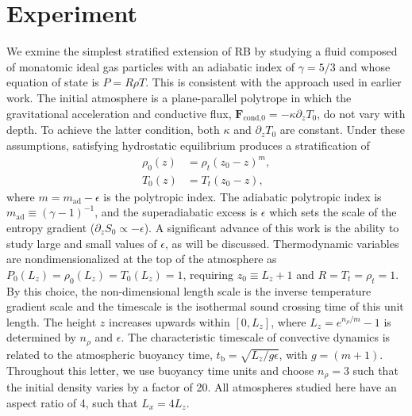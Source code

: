 \documentclass[aps, prl, twocolumn, nofootinbib, groupedaddress, amsfonts, amssymb, amsmath]{revtex4-1}
\begin{document}
\section{Experiment} 
\label{sec:experiment}
We exmine the simplest stratified extension of RB by studying a
fluid composed of monatomic ideal gas particles with an adiabatic 
index of $\gamma = 5/3$ and whose equation of state is $P = R\rho T$. 
This is consistent with the approach used in earlier work.
The initial atmosphere is a plane-parallel polytrope in which 
the gravitational acceleration and conductive flux, 
$\bm{F}_{\text{cond,0}} = -\kappa \partial_z T_0$, do not vary with depth. To
achieve the latter condition, both $\kappa$ and $\partial_z T_0$ are constant.
Under these assumptions, satisfying hydrostatic 
equilibrium produces a stratification of
\begin{equation}
\begin{split}
\rho_0(z) &= \rho_{t}(z_0 - z)^m, \\
T_0(z)    &= T_{t}(z_0 - z),
\label{eqn:polytrope}
\end{split}
\end{equation}
where $m = m_{\text{ad}} - \epsilon$ is the polytropic index.
The adiabatic polytropic index is $m_{\text{ad}} \equiv (\gamma-1)^{-1}$, and
the superadiabatic excess is $\epsilon$ which sets the scale 
of the entropy gradient ($\partial_z S_0 \propto -\epsilon$).
A significant advance of this work is the ability to study large 
and small values of $\epsilon$, as will be discussed.
Thermodynamic variables are nondimensionalized at the 
top of the atmosphere as  $P_0(L_z) = \rho_0(L_z) = T_0(L_z) = 1$, 
requiring $z_0 \equiv L_z + 1$ and $R = T_{t} = \rho_{t} = 1$.
By this choice, the non-dimensional length scale is the inverse 
temperature gradient scale and the timescale is the isothermal 
sound crossing time of this unit length.
The height $z$ increases upwards within $[0, L_{z}]$, 
where $L_{z} = e^{n_{\rho}/m} - 1$ is
determined by $n_\rho$ and $\epsilon$.
The characteristic timescale of convective dynamics
is related to the atmospheric buoyancy time, 
$t_{\text{b}} = \sqrt{L_z/g\epsilon}$, with $g = (m+1)$.
Throughout this letter, we use buoyancy time units and 
choose $n_{\rho} = 3$ such that the 
initial density varies by a factor of 20.
All atmospheres studied here have an aspect ratio of 4, 
such that $L_x = 4L_z$.
\end{document}
